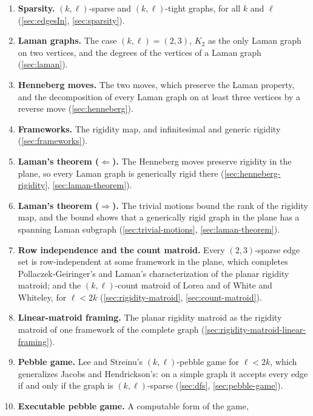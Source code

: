 \begin{enumerate}
  \item \textbf{Sparsity.} $(k,\ell)$-sparse and $(k,\ell)$-tight graphs,
        for all $k$ and $\ell$ (\cref{sec:edgesIn}, \cref{sec:sparsity}).
  \item \textbf{Laman graphs.} The case $(k,\ell) = (2,3)$, $K_2$ as the
        only Laman graph on two vertices, and the degrees of the vertices
        of a Laman graph (\cref{sec:laman}).
  \item \textbf{Henneberg moves.} The two moves, which preserve the Laman
        property, and the decomposition of every Laman graph on at least
        three vertices by a reverse move (\cref{sec:henneberg}).
  \item \textbf{Frameworks.} The rigidity map, and infinitesimal and
        generic rigidity (\cref{sec:frameworks}).
  \item \textbf{Laman's theorem ($\Leftarrow$).} The Henneberg moves
        preserve rigidity in the plane, so every Laman graph is
        generically rigid there (\cref{sec:henneberg-rigidity},
        \cref{sec:laman-theorem}).
  \item \textbf{Laman's theorem ($\Rightarrow$).} The trivial motions
        bound the rank of the rigidity map, and the bound shows that a
        generically rigid graph in the plane has a spanning Laman subgraph
        (\cref{sec:trivial-motions}, \cref{sec:laman-theorem}).
  \item \textbf{Row independence and the count matroid.} Every
        $(2,3)$-sparse edge set is row-independent at some framework in
        the plane, which completes Pollaczek-Geiringer's and Laman's
        characterization of the planar rigidity matroid; and the
        $(k,\ell)$-count matroid of Lorea and of White and Whiteley, for
        $\ell < 2k$ (\cref{sec:rigidity-matroid}, \cref{sec:count-matroid}).
  \item \textbf{Linear-matroid framing.} The planar rigidity matroid as
        the rigidity matroid of one framework of the complete graph
        (\cref{sec:rigidity-matroid-linear-framing}).
  \item \textbf{Pebble game.} Lee and Streinu's $(k,\ell)$-pebble game
        for $\ell < 2k$, which generalizes Jacobs and Hendrickson's: on a
        simple graph it accepts every edge if and only if the graph is
        $(k,\ell)$-sparse (\cref{sec:dfs}, \cref{sec:pebble-game}).
  \item \textbf{Executable pebble game.} A computable form of the game,

\end{enumerate}
